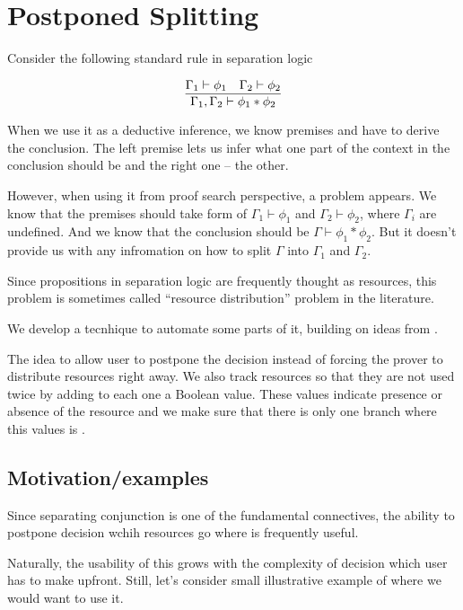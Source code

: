 \chapter{Postponed Splitting}
\label{chap:postponed_splitting}

Consider the following standard rule in separation logic

\[\infer{\Gamma_1, \Gamma_2 \vdash \phi_1 \ast \phi_2}
        {\Gamma_1 \vdash \phi_1 &
         \Gamma_2 \vdash \phi_2} \]

When we use it as a deductive inference, we know premises and have to derive the conclusion.
The left premise lets us infer what one part of the context in the conclusion should be and the right one -- the other.

However, when using it from proof search perspective, a problem appears.
We know that the premises should take form of \(\Gamma_1 \vdash \phi_1\) and \(\Gamma_2 \vdash \phi_2\), where $\Gamma_i$ are undefined.
And we know that the conclusion should be \(\Gamma \vdash \phi_1 \ast \phi_2\).
But it doesn't provide us with any infromation on how to split \(\Gamma\) into \(\Gamma_1\) and \(\Gamma_2\).

Since propositions in separation logic are frequently thought as resources, this problem is sometimes called ``resource distribution'' problem in the literature.

We develop a tecnhique to automate some parts of it, building on ideas from \citet{harlandResourceDistributionBooleanConstraints2003}.

The idea to allow user to postpone the decision instead of forcing the prover to distribute resources right away.
We also track resources so that they are not used twice by adding to each one a Boolean value.
These values indicate presence or absence of the resource and we make sure that there is only one branch where this values is \true.

\section{Motivation/examples}

Since separating conjunction is one of the fundamental connectives, the ability to postpone decision wchih resources go where is frequently useful.

Naturally, the usability of this grows with the complexity of decision which user has to make upfront.
Still, let's consider small illustrative example of where we would want to use it.


